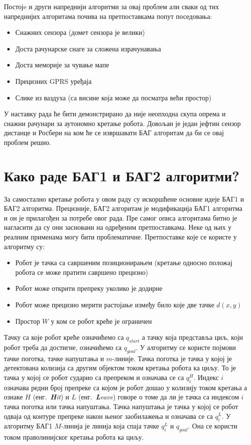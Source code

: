 \documentclass[12pt,oneside]{memoir}
\theoremstyle{remark}
\begin{document}
Постојe и други напреднији алгоритми за овај проблем али сваки од тих напреднијих алгоритама почива на претпоставкама попут поседовања:
\begin{itemize}
\item Снажних сензора (домет сензора је велики)
\item Доста рачунарске снаге за сложена израчунавања
\item Доста меморије за чување мапе
\item Прецизних GPRS уређаја
\item Слике из ваздуха (са висине која може да посматра већи простор)
\end{itemize}

У наставку рада ће бити демонстрирано да није неопходна скупа опрема и снажни рачунари за аутономно кретање робота. Довољан је један јефтин сензор дистанце и Росбери  на ком ће се извршавати БАГ алгоритам да би се овај проблем решио.

\section{Како раде БАГ1 и БАГ2 алгоритми?}
За самостално кретање робота у овом раду су искоршћене основне идеје БАГ1 и БАГ2 алгоритма. Прецизније, БАГ2 алгоритам је модификација БАГ1 алгоритма и он је прилагођен за потребе овог рада. Пре самог описа алгоритама битно је нагласити да су они засновани на одређеним претпоставкама. Неке од њих у реалним применама могу бити проблематичне. Претпоставке које се користе у алгоритму су:
\begin{itemize}
\item Робот је тачка са савршеним позиционирањем (кретање односно положај робота се може пратити савршено прецизно)
\item Робот може открити препреку уколико је додирне
\item Робот може прецизно мерити растојање између било које две тачке $d(x,y)$
\item Простор $W$ у ком се робот креће је ограничен
\end{itemize}

Тачку са које робот креће означићемо са $q_{start}$ а тачку која представља циљ, који робот треба да достигне, означићемо са $q_{goal}$. У алгоритму се користе појмови тачке поготка, тачке напуштања и $m$-линије. Тачка поготка је тачка у којој је детектована колизија са другим објектом током кретања робота ка циљу. То је тачка у којој се робот сударио са препреком и означава се са $q_i^H$. Индекс $i$ означава редни број препреке са којом је робот дошао у колизију током кретања а ознаке $H$  (енг.~{\em \textbf{H}it}) и $L$ (енг.~{\em \textbf{L}eave}) говоре о томе да ли је тачка са индексом $i$ тачка поготка или тачка напуштања. Тачка напуштања је тачка у којој се робот одваја од контуре препреке након њеног заобилажења и означава се са $q_i^L$. У алгоритму БАГ1 $M$-линија је линија која спаја тачке $q_i^L$ и $q_{goal}$. Она се користи током праволинијског кретања робота ка циљу.
\end{document}
